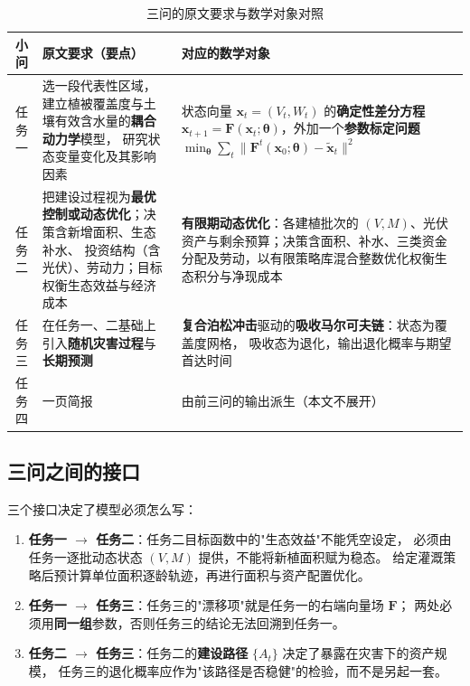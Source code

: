 \documentclass[11pt,a4paper]{ctexart}
\begin{document}
\begin{table}[H]\centering\small
\begin{tabularx}{\textwidth}{|c|X|X|}
\toprule
小问 & 原文要求（要点） & 对应的数学对象 \\
\midrule
任务一 & 选一段代表性区域，建立植被覆盖度与土壤有效含水量的\textbf{耦合动力学}模型，
研究状态变量变化及其影响因素 &
状态向量 $\bm{x}_t=(V_t,W_t)$ 的\textbf{确定性差分方程}
$\bm{x}_{t+1}=\bm{F}(\bm{x}_t;\bm{\theta})$，外加一个\textbf{参数标定问题}
$\min_{\bm{\theta}}\sum_t\|\bm{F}^t(\bm{x}_0;\bm{\theta})-\tilde{\bm{x}}_t\|^2$ \\
\addlinespace
任务二 & 把建设过程视为\textbf{最优控制或动态优化}；决策含新增面积、生态补水、
投资结构（含光伏）、劳动力；目标权衡生态效益与经济成本 &
\textbf{有限期动态优化}：各建植批次的 $(V,M)$、光伏资产与剩余预算；决策含面积、补水、三类资金分配及劳动，以有限策略库混合整数优化权衡生态积分与净现成本 \\
\addlinespace
任务三 & 在任务一、二基础上引入\textbf{随机灾害过程}与\textbf{长期预测} &
\textbf{复合泊松冲击}驱动的\textbf{吸收马尔可夫链}：状态为覆盖度网格，
吸收态为退化，输出退化概率与期望首达时间 \\
\addlinespace
任务四 & 一页简报 & 由前三问的输出派生（本文不展开） \\
\bottomrule
\end{tabularx}
\caption{三问的原文要求与数学对象对照}\label{tab:map}
\end{table}

\subsection{三问之间的接口}

三个接口决定了模型必须怎么写：

\begin{enumerate}
\item \textbf{任务一 $\to$ 任务二}：任务二目标函数中的"生态效益"不能凭空设定，
必须由任务一逐批动态状态 $(V,M)$ 提供，不能将新植面积赋为稳态。
给定灌溉策略后预计算单位面积逐龄轨迹，再进行面积与资产配置优化。
\item \textbf{任务一 $\to$ 任务三}：任务三的"漂移项"就是任务一的右端向量场 $\bm{F}$；
两处必须用\textbf{同一组}参数，否则任务三的结论无法回溯到任务一。
\item \textbf{任务二 $\to$ 任务三}：任务二的\textbf{建设路径} $\{A_t\}$ 决定了暴露在灾害下的资产规模，
任务三的退化概率应作为"该路径是否稳健"的检验，而不是另起一套。
\end{enumerate}
\end{document}
